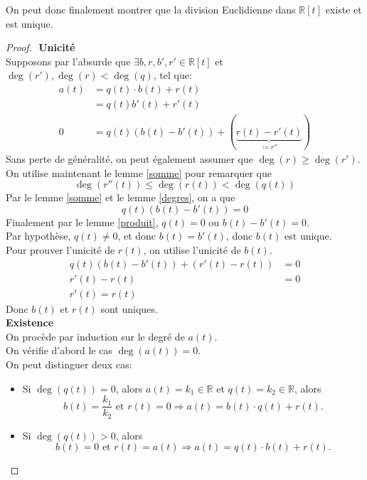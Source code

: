 \documentclass[11pt, a4paper, twoside]{article}
\begin{document}
On peut donc finalement montrer que la division Euclidienne dans $\mathbb{R}[t]$ existe et est unique.
\begin{proof}
$ $\newline
\textbf{Unicité}\\
Supposons par l'absurde que $\exists b,r,b',r' \in \mathbb{R}[t]$ et $\deg(r'),\deg(r) < \deg(q)$, tel que:
\begin{align*}
	a(t) &= q(t) \cdot b(t) + r(t)\\
	     &= q(t) b'(t) + r'(t)\\
	0 &= q(t)(b(t) - b'(t)) + (\underbrace{  r(t) - r'(t) }_{\coloneqq r''}) 
\end{align*}
Sans perte de généralité, on peut également assumer que $\deg(r) \geq \deg(r')$.\\
On utilise maintenant le lemme \ref{somme} pour remarquer que
\[ 
	\deg(r''(t)) \leq \deg(r(t)) < \deg(q(t))
\]
Par le lemme \ref{somme} et le lemme \ref{degres}, on a que 
\[ 
	q(t)(b(t) - b'(t)) = 0
\]
Finalement par le lemme \ref{produit}, $q(t)=0$ ou $b(t)-b'(t)=0$.\\
Par hypothèse, $q(t)\neq 0$, et donc $b(t) = b'(t) $, donc $b(t)$ est unique.\\
Pour prouver l'unicité de $r(t)$, on utilise l'unicité de $b(t)$.
\begin{align*}
	q(t)(b(t) - b'(t)) + ( r'(t) - r(t)) &=0\\
	r'(t) - r(t) &= 0\\
	r'(t) = r(t)
\end{align*}
Donc $b(t)$ et $r(t)$ sont uniques.\\

\textbf{Existence}\\
On procède par induction sur le degré de $a(t)$.\\
On vérifie d'abord le cas $\deg(a(t))=0$.\\
On peut distinguer deux cas:
\begin{itemize}
	\item Si $\deg(q(t))=0$, alors $a(t) = k_1 \in \mathbb{R}$ et $q(t) = k_2 \in \mathbb{R}$, alors
\[ 
	b(t) = \frac{k_1}{k_2} \text{ et } r(t)=0 \Rightarrow a(t) = b(t) \cdot q(t) + r(t)
.\]
\item Si $\deg(q(t))> 0$, alors
\[ 
	b(t) = 0  \text{ et } r(t) = a(t) \Rightarrow  a(t) = q(t) \cdot b(t) + r(t)
.\]


\end{itemize}
\end{proof}
\end{document}

